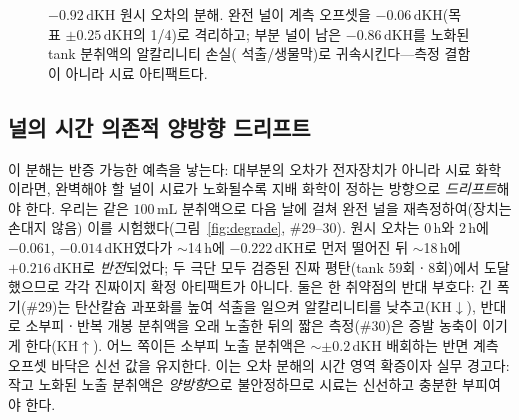 \documentclass[11pt]{article}
\newcommand{\dkh}{\ensuremath{\,\mathrm{dKH}}}
\begin{document}
\begin{figure}[t]
\centering
{}
\caption{$-0.92\dkh$ 원시 오차의 분해. 완전 널이 계측 오프셋을 $-0.06\dkh$(목표
$\pm0.25\dkh$의 1/4)로 격리하고; 부분 널이 남은 $-0.86\dkh$를 노화된 tank 분취액의
알칼리니티 손실( 석출/생물막)로 귀속시킨다---측정 결함이 아니라 시료
아티팩트다.}
\label{fig:budget}
\end{figure}

\subsection{널의 시간 의존적 양방향 드리프트}
이 분해는 반증 가능한 예측을 낳는다: 대부분의 오차가 전자장치가 아니라 시료 화학이라면,
완벽해야 할 널이 시료가 노화될수록 지배 화학이 정하는 방향으로 \emph{드리프트}해야 한다.
우리는 같은 $100\,\mathrm{mL}$ 분취액으로 다음 날에 걸쳐 완전 널을 재측정하여(장치는
손대지 않음) 이를 시험했다(그림~\ref{fig:degrade}, \#29--30). 원시 오차는 0\,h와
2\,h에 $-0.061$, $-0.014\dkh$였다가 $\sim$14\,h에 $-0.222\dkh$로 먼저 떨어진 뒤
$\sim$18\,h에 $+0.216\dkh$로 \emph{반전}되었다; 두 극단 모두 검증된 진짜 평탄(tank
59회ㆍ8회)에서 도달했으므로 각각 진짜이지 확정 아티팩트가 아니다. 둘은 한 취약점의 반대
부호다: 긴 폭기(\#29)는 탄산칼슘 과포화를 높여  석출을 일으켜 알칼리니티를
낮추고(KH$\downarrow$), 반대로 소부피ㆍ반복 개봉 분취액을 오래 노출한 뒤의 짧은
측정(\#30)은 증발 농축이 이기게 한다(KH$\uparrow$). 어느 쪽이든 소부피 노출 분취액은
$\sim\pm0.2\dkh$ 배회하는 반면 계측 오프셋 바닥은 신선 값을 유지한다. 이는 오차 분해의
시간 영역 확증이자 실무 경고다: 작고 노화된 노출 분취액은 \emph{양방향}으로 불안정하므로
시료는 신선하고 충분한 부피여야 한다.
\end{document}
